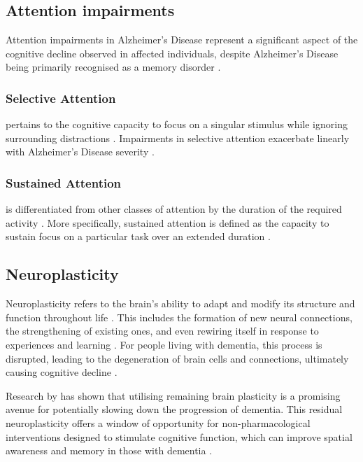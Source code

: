 \documentclass{l4proj}
\begin{document}
\subsection{Attention impairments}\label{sec:attention}
Attention impairments in Alzheimer’s Disease represent a significant aspect of the cognitive decline observed in affected individuals, despite Alzheimer’s Disease being primarily recognised as a memory disorder \citep{hennawy_sleep_2019}.

\subsubsection{Selective Attention}
pertains to the cognitive capacity to focus on a singular stimulus while ignoring surrounding distractions \citep{chau_exploring_2015}. Impairments in selective attention exacerbate linearly with Alzheimer’s Disease severity \citep{chau_exploring_2015}.

\subsubsection{Sustained Attention} is differentiated from other classes of attention by the duration of the required activity \citep{fortenbaugh_recent_2017}. More specifically, sustained attention is defined as the capacity to sustain focus on a particular task over an extended duration \citep{fortenbaugh_recent_2017}.

\subsection{Neuroplasticity}\label{sec:neuroplasticity}
Neuroplasticity refers to the brain's ability to adapt and modify its structure and function throughout life \citep{costandi_neuroplasticity_2016}. This includes the formation of new neural connections, the strengthening of existing ones, and even rewiring itself in response to experiences and learning \citep{costandi_neuroplasticity_2016}. For people living with dementia, this process is disrupted, leading to the degeneration of brain cells and connections, ultimately causing cognitive decline \citep{koch_chapter_2022}.

Research by \cite{hill_plasticity_2011} has shown that utilising remaining brain plasticity is a promising avenue for potentially slowing down the progression of dementia. This residual neuroplasticity offers a window of opportunity for non-pharmacological interventions designed to stimulate cognitive function, which can improve spatial awareness and memory in those with dementia \citep{boggio_non-invasive_2011}.
\end{document}
